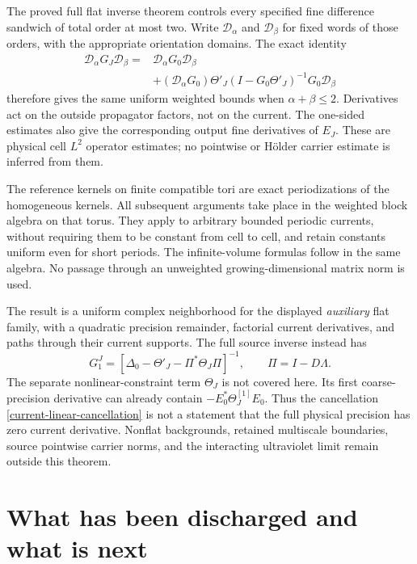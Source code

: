 \documentclass[11pt]{article}
\theoremstyle{remark}
\begin{document}
The proved full flat inverse theorem controls every specified fine
difference sandwich of total order at most two. Write
$\mathcal D_\alpha$ and $\mathcal D_\beta$ for fixed words of those
orders, with the appropriate orientation domains. The exact identity
\begin{equation}
 \begin{split}
 \mathcal D_\alpha G_J\mathcal D_\beta
 ={}&\mathcal D_\alpha G_0\mathcal D_\beta\\
 &+(\mathcal D_\alpha G_0)\Theta'_J
       (I-G_0\Theta'_J)^{-1}G_0\mathcal D_\beta
 \end{split}
 \label{current-spatial-derivative-transfer}
\end{equation}
therefore gives the same uniform weighted bounds when
$\alpha+\beta\le2$. Derivatives act on the outside propagator
factors, not on the current. The one-sided estimates also give
the corresponding output fine derivatives of $E_J$. These are
physical cell $L^2$ operator estimates; no pointwise or H\"older
carrier estimate is inferred from them.

The reference kernels on finite compatible tori are exact
periodizations of the homogeneous kernels. All subsequent arguments
take place in the weighted block algebra on that torus. They apply
to arbitrary bounded periodic currents, without requiring them to
be constant from cell to cell, and retain constants uniform even
for short periods. The infinite-volume formulas follow in the
same algebra. No passage through an unweighted growing-dimensional
matrix norm is used.

The result is a uniform complex neighborhood for the displayed
\emph{auxiliary} flat family, with a quadratic precision remainder,
factorial current derivatives, and paths through their current
supports. The full source inverse instead has
\[
 G_1^J=[\Delta_0-\Theta'_J-\Pi^*\Theta_J\Pi]^{-1},
 \qquad \Pi=I-D\Lambda.
\]
The separate nonlinear-constraint term $\Theta_J$ is not covered
here. Its first coarse-precision derivative can already contain
$-E_0^*\Theta^{[1]}_J E_0$. Thus the cancellation
\eqref{current-linear-cancellation} is not a statement that the
full physical precision has zero current derivative. Nonflat
backgrounds, retained multiscale boundaries, source pointwise
carrier norms, and the interacting ultraviolet limit remain
outside this theorem.
\section{What has been discharged and what is next}
\end{document}
